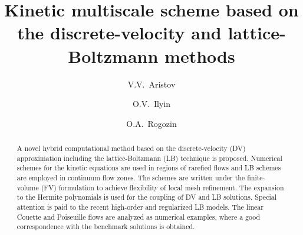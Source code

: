 \documentclass[]{elsarticle} %
\begin{document}
\begin{frontmatter}

\title{Kinetic multiscale scheme based on the discrete-velocity and lattice-Boltzmann methods}

\author[ccas]{V.V.~Aristov}

\author[ccas]{O.V.~Ilyin}

\author[skoltech,ccas]{O.A.~Rogozin}



\address[ccas]{Dorodnicyn Computing Center,
    Federal Research Center "Computer Science and Control" of Russian Academy of Science, Moscow, Russia}
\address[skoltech]{Center for Design, Manufacturing, and Materials,
    Skolkovo Institute of Science and Technology, Moscow, Russia}

\begin{abstract}

A novel hybrid computational method based on the discrete-velocity (DV) approximation including the lattice-Boltzmann (LB) technique is proposed.
Numerical schemes for the kinetic equations are used in regions of rarefied flows and LB schemes are employed in continuum flow zones.
The schemes are written under the finite-volume (FV) formulation to achieve flexibility of local mesh refinement.
The expansion to the Hermite polynomials is used for the coupling of DV and LB solutions.
Special attention is paid to the recent high-order and regularized LB models.
The linear Couette and Poiseuille flows are analyzed as numerical examples,
where a good correspondence with the benchmark solutions is obtained.






\end{abstract}
\end{frontmatter}
\end{document}
